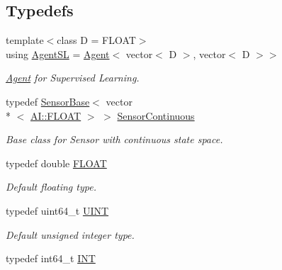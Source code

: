 \subsection*{Typedefs}
\begin{DoxyCompactItemize}
\item 
{\footnotesize template$<$class D  = F\-L\-O\-A\-T$>$ }\\using \hyperlink{namespaceAI_acd3da5a0aa6fc3b0e9988d4a6251bdbd}{Agent\-S\-L} = \hyperlink{classAI_1_1Agent}{Agent}$<$ vector$<$ D $>$, vector$<$ D $>$$>$
\begin{DoxyCompactList}\small\item\em \hyperlink{classAI_1_1Agent}{Agent} for Supervised Learning. \end{DoxyCompactList}\item 
\hypertarget{namespaceAI_a7ceaa7caf6e3bf156b8d2ab429d981b8}{typedef \hyperlink{classAI_1_1SensorBase}{Sensor\-Base}$<$ vector\\*
$<$ \hyperlink{namespaceAI_a41b74884a20833db653dded3918e05c3}{A\-I\-::\-F\-L\-O\-A\-T} $>$ $>$ \hyperlink{namespaceAI_a7ceaa7caf6e3bf156b8d2ab429d981b8}{Sensor\-Continuous}}\label{namespaceAI_a7ceaa7caf6e3bf156b8d2ab429d981b8}

\begin{DoxyCompactList}\small\item\em Base class for Sensor with continuous state space. \end{DoxyCompactList}\item 
\hypertarget{namespaceAI_a41b74884a20833db653dded3918e05c3}{typedef double \hyperlink{namespaceAI_a41b74884a20833db653dded3918e05c3}{F\-L\-O\-A\-T}}\label{namespaceAI_a41b74884a20833db653dded3918e05c3}

\begin{DoxyCompactList}\small\item\em Default floating type. \end{DoxyCompactList}\item 
\hypertarget{namespaceAI_ab6e14dc1e659854858a87e511f1439ec}{typedef uint64\-\_\-t \hyperlink{namespaceAI_ab6e14dc1e659854858a87e511f1439ec}{U\-I\-N\-T}}\label{namespaceAI_ab6e14dc1e659854858a87e511f1439ec}

\begin{DoxyCompactList}\small\item\em Default unsigned integer type. \end{DoxyCompactList}\item 
\hypertarget{namespaceAI_ac74584e573f07aa4194b461b1ba7be64}{typedef int64\-\_\-t \hyperlink{namespaceAI_ac74584e573f07aa4194b461b1ba7be64}{I\-N\-T}}\label{namespaceAI_ac74584e573f07aa4194b461b1ba7be64}


\end{DoxyCompactItemize}
